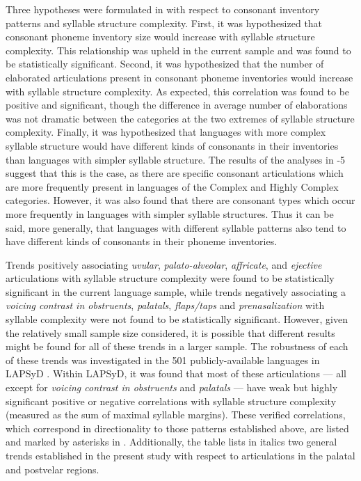   Three hypotheses were formulated in  with respect to consonant inventory patterns and syllable structure complexity. First, it was hypothesized that consonant phoneme inventory size would increase with syllable structure complexity. This relationship was upheld in the current sample and was found to be statistically significant. Second, it was hypothesized that the number of elaborated articulations present in consonant phoneme inventories would increase with syllable structure complexity. As expected, this correlation was found to be positive and significant, though the difference in average number of elaborations was not dramatic between the categories at the two extremes of syllable structure complexity. Finally, it was hypothesized that languages with more complex syllable structure would have different kinds of consonants in their inventories than languages with simpler syllable structure. The results of the analyses in -5 suggest that this is the case, as there are specific consonant articulations which are more frequently present in languages of the Complex and Highly Complex categories. However, it was also found that there are consonant types which occur more frequently in languages with simpler syllable structures. Thus it can be said, more generally, that languages with different syllable patterns also tend to have different kinds of consonants in their phoneme inventories.

  Trends positively associating \textit{uvular}, \textit{palato-alveolar}, \textit{affricate}, and \textit{ejective} articulations with syllable structure complexity were found to be statistically significant in the current language sample, while trends negatively associating a \textit{voicing contrast in obstruents}, \textit{palatals}, \textit{flaps/taps} and \textit{prenasalization} with syllable complexity were not found to be statistically significant. However, given the relatively small sample size considered, it is possible that different results might be found for all of these trends in a larger sample. The robustness of each of these trends was investigated in the 501 publicly-available languages in LAPSyD \citep{MaddiesonEtAl2013}. Within LAPSyD, it was found that most of these articulations — all except for \textit{voicing contrast in obstruents} and \textit{palatals} — have weak but highly significant positive or negative correlations with syllable structure complexity (measured as the sum of maximal syllable margins). These verified correlations, which correspond in directionality to those patterns established above, are listed and marked by asterisks in . Additionally, the table lists in italics two general trends established in the present study with respect to articulations in the palatal and postvelar regions.

